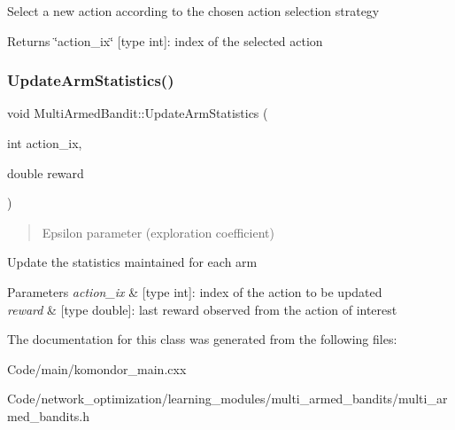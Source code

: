 Select a new action according to the chosen action selection strategy \begin{DoxyReturn}{Returns}
\char`\"{}action\+\_\+ix\char`\"{} \mbox{[}type int\mbox{]}\+: index of the selected action 
\end{DoxyReturn}
\mbox{\label{classMultiArmedBandit_a88a82de9923f34c3baaa1c861a6b6e0d}} 
\subsubsection{\texorpdfstring{Update\+Arm\+Statistics()}{UpdateArmStatistics()}}
{\footnotesize\ttfamily void Multi\+Armed\+Bandit\+::\+Update\+Arm\+Statistics (\begin{DoxyParamCaption}\item[{int}]{action\+\_\+ix,  }\item[{double}]{reward }\end{DoxyParamCaption})\hspace{0.3cm}{\ttfamily [inline]}}



\begin{quote}
Epsilon parameter (exploration coefficient) \end{quote}


Update the statistics maintained for each arm 
\begin{DoxyParams}{Parameters}
{\em action\+\_\+ix} & \mbox{[}type int\mbox{]}\+: index of the action to be updated \\
\hline
{\em reward} & \mbox{[}type double\mbox{]}\+: last reward observed from the action of interest \\
\hline
\end{DoxyParams}


The documentation for this class was generated from the following files\+:\begin{DoxyCompactItemize}
\item 
Code/main/komondor\+\_\+main.\+cxx\item 
Code/network\+\_\+optimization/learning\+\_\+modules/multi\+\_\+armed\+\_\+bandits/multi\+\_\+armed\+\_\+bandits.\+h\end{DoxyCompactItemize}
